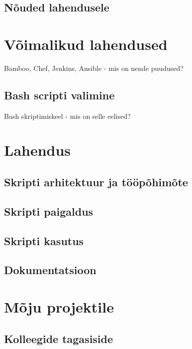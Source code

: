 \documentclass[12pt]{report}
\begin{document}
  
  \subsection{Nõuded lahendusele}
  
  \newpage
  
  \section{Võimalikud lahendused}
  Bamboo, Chef, Jenkins, Ansible - mis on nende puudused?\\
  \subsection{Bash scripti valimine}
  Bash skriptimiskeel - mis on selle eelised?
  
  \newpage
  
  \section{Lahendus}
  
  \subsection{Skripti arhitektuur ja tööpõhimõte}
  
  \subsection{Skripti paigaldus}
  
  \subsection{Skripti kasutus}
  
  \subsection{Dokumentatsioon}
  
  \newpage
  
  \section{Mõju projektile}
  
  \subsection{Kolleegide tagasiside}
  
\end{document}
